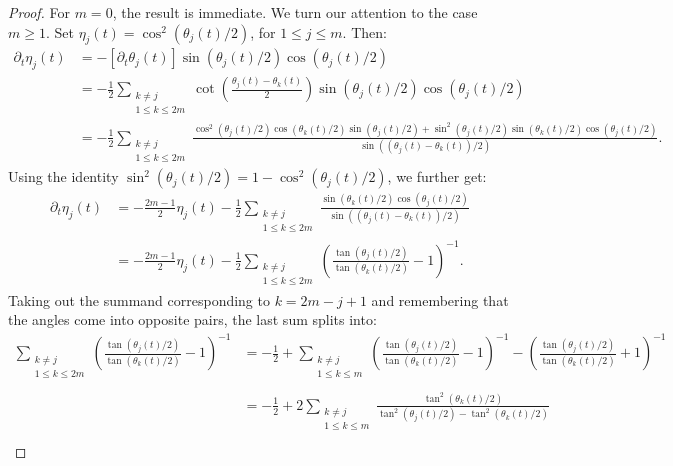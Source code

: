 \documentclass[12pt,reqno]{amsart}
\begin{document}
\begin{proof}
For $m=0$, the result is immediate. 
We turn our attention to the case $ m\ge 1$. Set $\eta_j(t) = \cos^2(\theta_j(t)/2)$, for $1 \leq j \leq m$. Then: 
\begin{align*}
\partial_t \eta_j(t) &= -\left[\partial_t \theta_j(t)\right] \sin(\theta_j(t)/2)\cos(\theta_j(t)/2)\\
&= -\frac{1}{2}\sum_{\substack{k\neq j \\ 1 \leq k \leq 2m}} \cot\left(\frac{\theta_j(t) - \theta_k(t)}{2}\right) \sin(\theta_j(t)/2)\cos(\theta_j(t)/2) \\
&= -\frac{1}{2}\sum_{\substack{k\neq j \\ 1 \leq k \leq 2m}} \frac{\cos^2(\theta_j(t)/2)\cos(\theta_k(t)/2)\sin(\theta_j(t)/2) 
+ \sin^2(\theta_j(t)/2)\sin(\theta_k(t)/2)\cos(\theta_j(t)/2) }{\sin((\theta_j(t) - \theta_k(t))/2)}.
\end{align*}
Using the identity $\sin^2(\theta_j(t)/2) = 1- \cos^2(\theta_j(t)/2)$, we further get:
\begin{align*}
\partial_t \eta_j(t) &= -\frac{2m-1}{2}\eta_j(t) - \frac{1}{2} \sum_{\substack{k\neq j \\ 1 \leq k \leq 2m}} \frac{\sin(\theta_k(t)/2)\cos(\theta_j(t)/2)}{\sin((\theta_j(t) - \theta_k(t))/2)} \\
&= - \frac{2m-1}{2}\eta_j(t) - \frac{1}{2} \sum_{\substack{k\neq j \\ 1 \leq k \leq 2m}}\left(\frac{\tan(\theta_j(t)/2)}{\tan(\theta_k(t)/2)} - 1\right)^{-1}.
\end{align*}
Taking out the summand corresponding to $k=2m-j+1$ and remembering that the angles come into opposite pairs, the last sum splits into:
\begin{align*}
\sum_{\substack{k\neq j \\ 1 \leq k \leq 2m}}\left(\frac{\tan(\theta_j(t)/2)}{\tan(\theta_k(t)/2)} - 1\right)^{-1} & = -\frac{1}{2} +
\sum_{\substack{k\neq j \\ 1 \leq k \leq m}}\left(\frac{\tan(\theta_j(t)/2)}{\tan(\theta_k(t)/2)} - 1\right)^{-1}  
 - \left(\frac{\tan(\theta_j(t)/2)}{\tan(\theta_k(t)/2)} + 1\right)^{-1} \\
 \\
&= -\frac{1}{2} + 2\sum_{\substack{k\neq j \\ 1 \leq k \leq m}}\frac{\tan^2(\theta_k(t)/2)}{{\tan^2(\theta_j(t)/2)}-{\tan^2(\theta_k(t)/2)}} \\

\end{align*}
\end{proof}
\end{document}
